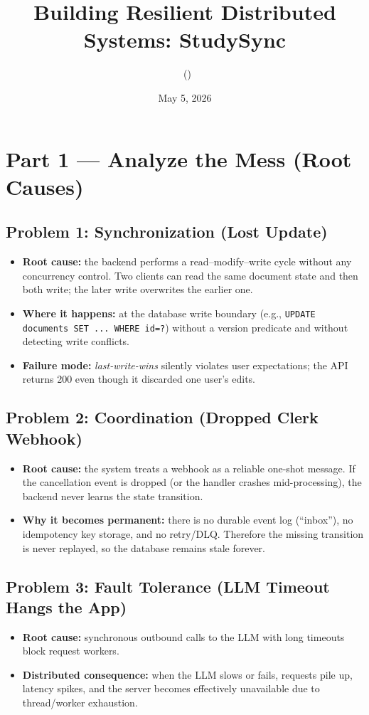 \documentclass[11pt]{article}
\title{Building Resilient Distributed Systems: StudySync}
\author{\StudentName\ (\StudentID)}
\date{May 5, 2026}
\begin{document}
\maketitle

\section*{Part 1 --- Analyze the Mess (Root Causes)}

\subsection*{Problem 1: Synchronization (Lost Update)}
\begin{itemize}
  \item \textbf{Root cause:} the backend performs a read--modify--write cycle without any concurrency control.
  Two clients can read the same document state and then both write; the later write overwrites the earlier one.
  \item \textbf{Where it happens:} at the database write boundary (e.g., \texttt{UPDATE documents SET ... WHERE id=?})
  without a version predicate and without detecting write conflicts.
  \item \textbf{Failure mode:} \emph{last-write-wins} silently violates user expectations; the API returns 200 even though it
  discarded one user's edits.
\end{itemize}

\subsection*{Problem 2: Coordination (Dropped Clerk Webhook)}
\begin{itemize}
  \item \textbf{Root cause:} the system treats a webhook as a reliable one-shot message.
  If the cancellation event is dropped (or the handler crashes mid-processing), the backend never learns the state transition.
  \item \textbf{Why it becomes permanent:} there is no durable event log (``inbox''), no idempotency key storage, and no retry/DLQ.
  Therefore the missing transition is never replayed, so the database remains stale forever.
\end{itemize}

\subsection*{Problem 3: Fault Tolerance (LLM Timeout Hangs the App)}
\begin{itemize}
  \item \textbf{Root cause:} synchronous outbound calls to the LLM with long timeouts block request workers.
  \item \textbf{Distributed consequence:} when the LLM slows or fails, requests pile up, latency spikes, and the server becomes effectively unavailable
  due to thread/worker exhaustion.
\end{itemize}
\end{document}
